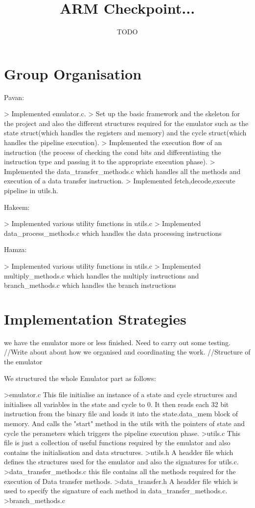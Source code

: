 \documentclass[11pt]{article}
\begin{document}
\title{ARM Checkpoint... }
\author{TODO}

\maketitle

\section{Group Organisation}
Pavan:

> Implemented emulator.c.
> Set up the basic framework and the skeleton for the project and also the
different structures required for the emulator such as the state struct(which handles the registers and memory)
and the cycle struct(which handles the pipeline execution).
> Implemented the execution flow of an instruction
(the process of checking the cond bits and differentiating the instruction type and passing it to the appropriate execution phase).
> Implemented the data_transfer_methods.c which handles all the methods and execution of a data transfer instruction.
> Implemented fetch,decode,execute pipeline in utils.h.

Hakeem:

> Implemented various utility functions in utils.c
> Implemented data_process_methods.c which handles the data processing instructions

Hamza:

> Implemented various utility functions in utils.c
> Implemented multiply_methods.c which handles the multiply instructions and branch_methods.c which handles the branch instructions



\section{Implementation Strategies}

we have the emulator more or less finished. Need to carry out some testing.
//Write about about how we organised and coordinating the work.
//Structure of the emulator

We structured the whole Emulator part as follows:

>emulator.c
This file initialise an instance of a state and cycle structures and initialises all variables in the state and cycle to 0.
It then reads each 32 bit instruction from the binary file and loads it into the state.data_mem block of memory. And calls the "start"
method in the utils with the pointers of state and cycle the perameters which triggers the pipeline execution phase.
>utils.c
This file is just a collection of useful functions required by the emulator and also contains the initialisation and data structures.
>utils.h
A headder file which defines the structures used for the emulator and also the signatures for utils.c.
>data_transfer_methods.c
this file contains all the methods required for the execution of Data transfer methods.
>data_transfer.h
A headder file which is used to specify the signature of each method in data_transfer_methods.c.
>branch_methods.c
\end{document}
